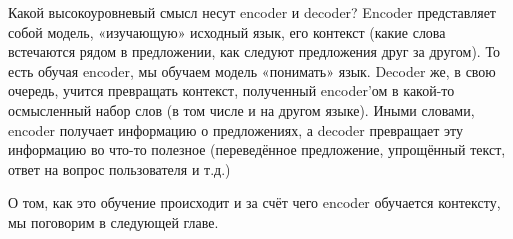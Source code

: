 Какой высокоуровневый смысл несут encoder и decoder? Encoder представляет собой модель, «изучающую» исходный язык, его контекст (какие слова встечаются рядом в предложении, как следуют предложения друг за другом). То есть обучая encoder, мы обучаем модель «понимать» язык. Decoder же, в свою очередь, учится превращать контекст, полученный encoder'ом в какой-то осмысленный набор слов (в том числе и на другом языке). Иными словами, encoder получает информацию о предложениях, а decoder превращает эту информацию во что-то полезное (переведённое предложение, упрощённый текст, ответ на вопрос пользователя и т.д.)

О том, как это обучение происходит и за счёт чего encoder обучается контексту, мы поговорим в следующей главе.
